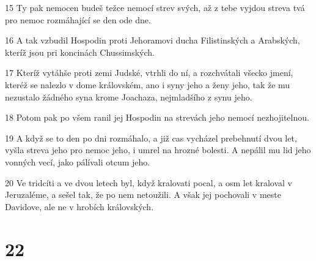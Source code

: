 \par 15 Ty pak nemocen budeš težce nemocí strev svých, až z tebe vyjdou streva tvá pro nemoc rozmáhající se den ode dne.
\par 16 A tak vzbudil Hospodin proti Jehoramovi ducha Filistinských a Arabských, kteríž jsou pri koncinách Chussimských.
\par 17 Kteríž vytáhše proti zemi Judské, vtrhli do ní, a rozchvátali všecko jmení, kteréž se nalezlo v dome královském, ano i syny jeho a ženy jeho, tak že mu nezustalo žádného syna krome Joachaza, nejmladšího z synu jeho.
\par 18 Potom pak po všem ranil jej Hospodin na strevách jeho nemocí nezhojitelnou.
\par 19 A když se to den po dni rozmáhalo, a již cas vycházel prebehnutí dvou let, vyšla streva jeho pro nemoc jeho, i umrel na hrozné bolesti. A nepálil mu lid jeho vonných vecí, jako pálívali otcum jeho.
\par 20 Ve tridcíti a ve dvou letech byl, když kralovati pocal, a osm let kraloval v Jeruzaléme, a sešel tak, že po nem netoužili. A však jej pochovali v meste Davidove, ale ne v hrobích královských.

\chapter{22}

